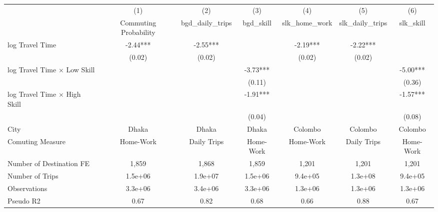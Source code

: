{
\def\sym#1{\ifmmode^{#1}\else\(^{#1}\)\fi}
\begin{tabular}{l*{6}{c}}
\toprule
            &\multicolumn{1}{c}{(1)}&\multicolumn{1}{c}{(2)}&\multicolumn{1}{c}{(3)}&\multicolumn{1}{c}{(4)}&\multicolumn{1}{c}{(5)}&\multicolumn{1}{c}{(6)}\\
            &\multicolumn{1}{c}{Commuting Probability}&\multicolumn{1}{c}{bgd\_daily\_trips}&\multicolumn{1}{c}{bgd\_skill}&\multicolumn{1}{c}{slk\_home\_work}&\multicolumn{1}{c}{slk\_daily\_trips}&\multicolumn{1}{c}{slk\_skill}\\
\addlinespace\addlinespace
log Travel Time&       -2.44***&       -2.55***&               &       -2.19***&       -2.22***&               \\
            &      (0.02)   &      (0.02)   &               &      (0.02)   &      (0.02)   &               \\
\addlinespace
log Travel Time $\times$ Low Skill&               &               &       -3.73***&               &               &       -5.00***\\
            &               &               &      (0.11)   &               &               &      (0.36)   \\
\addlinespace
log Travel Time $\times$ High Skill&               &               &       -1.91***&               &               &       -1.57***\\
            &               &               &      (0.04)   &               &               &      (0.08)   \\
\addlinespace\addlinespace
City        &       Dhaka   &       Dhaka   &       Dhaka   &     Colombo   &     Colombo   &     Colombo   \\
Comuting Measure&   Home-Work   & Daily Trips   &   Home-Work   &   Home-Work   & Daily Trips   &   Home-Work   \\
Number of Destination FE&       1,859   &       1,868   &       1,859   &       1,201   &       1,201   &       1,201   \\
Number of Trips&     1.5e+06   &     1.9e+07   &     1.5e+06   &     9.4e+05   &     1.3e+08   &     9.4e+05   \\
Observations&     3.3e+06   &     3.4e+06   &     3.3e+06   &     1.3e+06   &     1.3e+06   &     1.3e+06   \\
Pseudo R2   &        0.67   &        0.82   &        0.68   &        0.66   &        0.88   &        0.67   \\
\bottomrule
\end{tabular}
}
